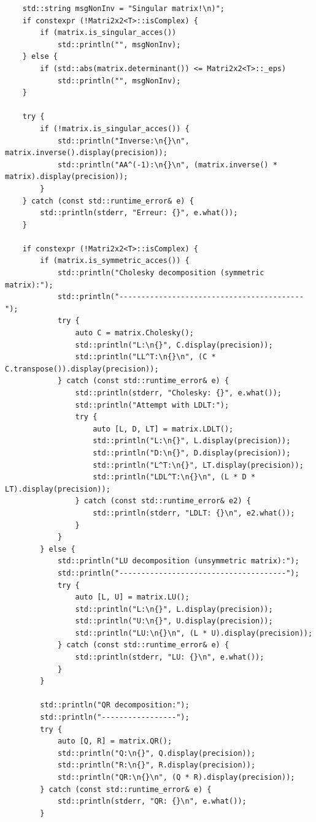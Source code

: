 \documentclass[11pt]{article}
\begin{document}
\begin{lstlisting}
    std::string msgNonInv = "Singular matrix!\n)";
    if constexpr (!Matri2x2<T>::isComplex) {
        if (matrix.is_singular_acces())
            std::println("", msgNonInv);
    } else {
        if (std::abs(matrix.determinant()) <= Matri2x2<T>::_eps)
            std::println("", msgNonInv);
    }

    try {
        if (!matrix.is_singular_acces()) {
            std::println("Inverse:\n{}\n", matrix.inverse().display(precision));
            std::println("AA^(-1):\n{}\n", (matrix.inverse() * matrix).display(precision));
        }
    } catch (const std::runtime_error& e) {
        std::println(stderr, "Erreur: {}", e.what());
    }
        
    if constexpr (!Matri2x2<T>::isComplex) {
        if (matrix.is_symmetric_acces()) {
            std::println("Cholesky decomposition (symmetric matrix):");
            std::println("------------------------------------------");
            try {
                auto C = matrix.Cholesky();
                std::println("L:\n{}", C.display(precision));
                std::println("LL^T:\n{}\n", (C * C.transpose()).display(precision));
            } catch (const std::runtime_error& e) {
                std::println(stderr, "Cholesky: {}", e.what());
                std::println("Attempt with LDLT:");
                try {
                    auto [L, D, LT] = matrix.LDLT();
                    std::println("L:\n{}", L.display(precision));
                    std::println("D:\n{}", D.display(precision));
                    std::println("L^T:\n{}", LT.display(precision));
                    std::println("LDL^T:\n{}\n", (L * D * LT).display(precision));
                } catch (const std::runtime_error& e2) {
                    std::println(stderr, "LDLT: {}\n", e2.what());
                }
            }
        } else {
            std::println("LU decomposition (unsymmetric matrix):");
            std::println("--------------------------------------");
            try {
                auto [L, U] = matrix.LU();
                std::println("L:\n{}", L.display(precision));
                std::println("U:\n{}", U.display(precision));
                std::println("LU:\n{}\n", (L * U).display(precision));
            } catch (const std::runtime_error& e) {
                std::println(stderr, "LU: {}\n", e.what());
            }
        }

        std::println("QR decomposition:");
        std::println("-----------------");
        try {
            auto [Q, R] = matrix.QR();
            std::println("Q:\n{}", Q.display(precision));
            std::println("R:\n{}", R.display(precision));
            std::println("QR:\n{}\n", (Q * R).display(precision));
        } catch (const std::runtime_error& e) {
            std::println(stderr, "QR: {}\n", e.what());
        }


\end{lstlisting}
\end{document}
